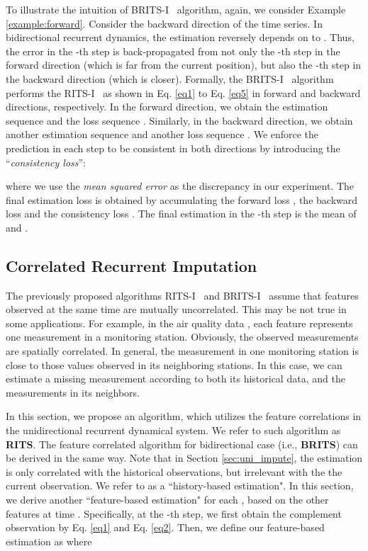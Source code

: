 \documentclass{article}
\newcommand{\ritsi}{\xspace{RITS-I}}
\newcommand{\britsi}{\xspace{BRITS-I}}
\newcommand{\rits}{\xspace{RITS}}
\newcommand{\methodname}{\xspace{BRITS}}
\begin{document}
To illustrate the intuition of \britsi~ algorithm, again, we consider Example \ref{example:forward}. Consider the backward direction of the time series. In bidirectional recurrent dynamics, the estimation  reversely depends on  to . Thus, the error in the -th step is back-propagated from not only the -th step in the forward direction (which is far from the current position), but also the -th step in the backward direction (which is closer).
Formally, the \britsi~ algorithm performs the \ritsi~ as shown in Eq. \eqref{eq1} to Eq. \eqref{eq5} in forward and backward directions, respectively. In the forward direction, we obtain the estimation sequence  and the loss sequence . Similarly, in the backward direction, we obtain another estimation sequence  and another loss sequence . We enforce the prediction in each step to be consistent in both directions by introducing the ``{\em consistency loss}'':

where we use the {\em mean squared error} as the discrepancy in our experiment. The final estimation loss is obtained by accumulating the forward loss , the backward loss  and the consistency loss . The final estimation in the -th step is the mean of  and .

















 \subsection{Correlated Recurrent Imputation}
\label{sec:feature_dependent}
The previously proposed algorithms \ritsi~ and \britsi~ assume that features observed at the same time are mutually uncorrelated.  This may  be not true in some applications. For example, in the air quality data \cite{yi2016st}, each feature represents one measurement in a monitoring station. Obviously,  the observed measurements are spatially correlated. In general, the measurement in one monitoring station is close to those values observed in its neighboring stations. In this case, we can estimate a missing measurement according to both its historical data, and the measurements in its neighbors.

In this section, we propose an algorithm, which utilizes the feature correlations in the unidirectional recurrent dynamical system. We refer to such algorithm as {\bf \rits}. The feature correlated algorithm for bidirectional case (i.e., {\bf \methodname})  can be derived in the same way. Note that in Section \ref{sec:uni_impute}, the estimation  is only correlated with the historical observations, but irrelevant with the the current observation. We refer to  as a ``history-based estimation". In this section, we derive another ``feature-based estimation" for each , based on the other features at time . Specifically, at the -th step, we first obtain the complement observation  by Eq. \eqref{eq1} and Eq. \eqref{eq2}. Then, we define our feature-based estimation as  where 
\end{document}
